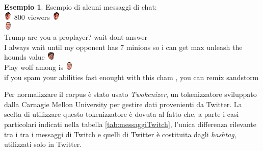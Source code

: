\documentclass[a4paper,12pt,openright,twoside]{report}
\theoremstyle{definition}
\newtheorem{es}{Esempio}[section]
\begin{document}
\begin{es} Esempio di alcuni messaggi di chat:\\
	\includegraphics[height=0.4cm, width=0.4cm]{Immagini/Emoticons/elegiggle.png} 800 viewers \includegraphics[height=0.4cm, width=0.4cm]{Immagini/Emoticons/elegiggle.png} \\
\includegraphics[height=0.4cm, width=0.4cm]{Immagini/Emoticons/4head.png}\\
Trump are you a proplayer? wait dont answer\\
I always wait until my opponent has 7 minions so i can get max unleash the hounds value \includegraphics[height=0.4cm, width=0.4cm]{Immagini/Emoticons/kappahd.png}\\
Play wolf among is \includegraphics[height=0.4cm, width=0.4cm]{Immagini/Emoticons/4head.png}\\
if you spam your abilities fast enought with this cham , you can remix sandstorm\\
	\label{es:frasi}
\end{es}
Per normalizzare il corpus è stato usato \emph{Twokenizer}, un tokenizzatore sviluppato dalla Carnagie Mellon University
per gestire dati provenienti da Twitter. 
La scelta di utilizzare questo tokenizzatore è dovuta al fatto che, a parte i casi particolari indicati 
nella tabella
\ref{tab:messaggiTwitch}, l'unica differenza rilevante tra i tra i messaggi di Twitch e
quelli di Twitter è costituita dagli
\emph{hashtag}, utilizzati solo in Twitter. 
\end{document}
